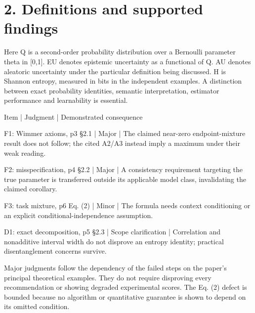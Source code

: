 \documentclass[10pt]{article}
\begin{document}
\section*{2. Definitions and supported findings}
Here Q is a second-order probability distribution over a Bernoulli parameter theta in [0,1]. EU denotes epistemic uncertainty as a functional of Q. AU denotes aleatoric uncertainty under the particular definition being discussed. H is Shannon entropy, measured in bits in the independent examples. A distinction between exact probability identities, semantic interpretation, estimator performance and learnability is essential.\par
Item | Judgment | Demonstrated consequence\par
F1: Wimmer axioms, p3 §2.1 | Major | The claimed near-zero endpoint-mixture result does not follow; the cited A2/A3 instead imply a maximum under their weak reading.\par
F2: misspecification, p4 §2.2 | Major | A consistency requirement targeting the true parameter is transferred outside its applicable model class, invalidating the claimed corollary.\par
F3: task mixture, p6 Eq. (2) | Minor | The formula needs context conditioning or an explicit conditional-independence assumption.\par
D1: exact decomposition, p5 §2.3 | Scope clarification | Correlation and nonadditive interval width do not disprove an entropy identity; practical disentanglement concerns survive.\par
Major judgments follow the dependency of the failed steps on the paper’s principal theoretical examples. They do not require disproving every recommendation or showing degraded experimental scores. The Eq. (2) defect is bounded because no algorithm or quantitative guarantee is shown to depend on its omitted condition.\par
\end{document}
